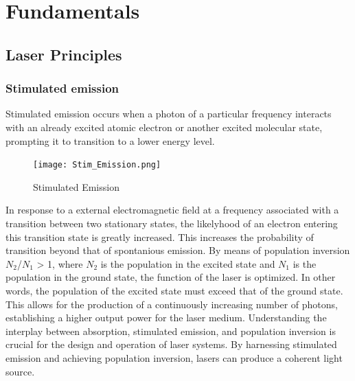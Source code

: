 \section{Fundamentals}
\label{sec:fundamentals}

\subsection{Laser Principles}
    
    \subsubsection{Stimulated emission}
    Stimulated emission occurs when a photon of a particular frequency interacts with an already excited atomic electron or another excited molecular state, prompting it to transition to a lower energy level.
   
    
    \begin{figure}
        \centering
        \texttt{[image: Stim\_Emission.png]}
        
        \caption[width = 0.1\textwidth]{ Stimulated Emission  \cite{Laser_cav} }
        \label{fig:energy_diagram}
    \end{figure}
    \noindent In response to a external electromagnetic field at a frequency associated with a transition between two stationary states, the likelyhood of an electron entering this transition state is greatly increased.
    This increases the probability of transition beyond that of spontanious emission. 
    By means of population inversion $N_2$/$N_1$ > 1, where $N_2$ is the population in the excited state and $N_1$ is the population in the ground state, the function of the laser is optimized.
    In other words, the population of the excited state must exceed that of the ground state.
    This allows for the production of a continuously increasing number of photons, establishing a higher output power for the laser medium.
    Understanding the interplay between absorption, stimulated emission, and population inversion is crucial for the design and operation of laser systems.
    By harnessing stimulated emission and achieving population inversion, lasers can produce a coherent light source. \cite{Laser_cav}

